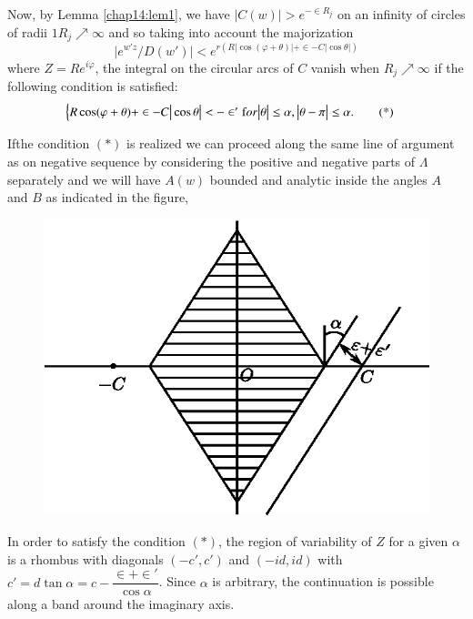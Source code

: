 Now, by Lemma \ref{chap14:lem1}, we have $\big | C(w) \big | > e^{- \in 
 R_j}$ on an infinity of circles of radii $1 R_j \nearrow \infty$ and
so taking into account the majorization 
$$
\big | e^{w' z }/ D (w') \big | < e^{r (R \big | \cos (\varphi +
 \theta) \big | + \in - C \big | \cos \theta \big | )} 
$$
where $Z = Re^{i \varphi}$, the integral on the circular arcs of $C$
vanish when $R_j \nearrow \infty$ if the following condition is
satisfied: 
\begin{equation}
 \begin{cases} R \cos (\varphi + \theta ) + \in - C \big |
 \cos \theta \big | < - \in ' \text for \big | \theta \big
 | \le \alpha, \big | \theta - \pi \big | \le \alpha. \tag{*} 
 \end{cases}
\end{equation}

If\pageoriginale the condition $(*)$ is realized we can proceed along the same line
of argument as on negative sequence by considering the positive and
negative parts of $\Lambda$ separately and we will have $A(w)$ bounded
and analytic inside the angles $A$ and $B$ as indicated in the figure, 
 \begin{figure}[H]
 \centerline{\includegraphics{vol15-figures/fig15-16.eps}}
 \end{figure}

In order to satisfy the condition $(*)$, the region of variability of
$Z$ for a given $\alpha$ is a rhombus with diagonals $(-c', c')$ and
$(- id, id)$ with $c' = d \tan \alpha= c - \dfrac{\in +
 \in '}{\cos \alpha}$. Since $\alpha$ is arbitrary, the
continuation is possible along a band around the imaginary axis. 

